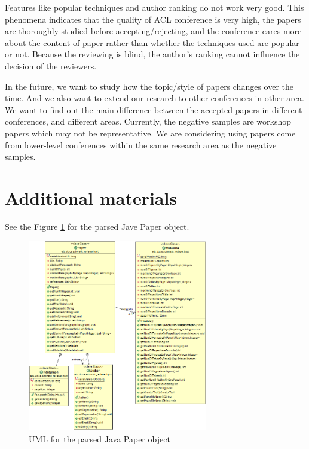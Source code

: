 \documentclass[11pt,letterpaper]{article}
\begin{document}
Features like popular techniques and author ranking do not work very good. 
This phenomena indicates that the quality of ACL conference is very high, the papers are thoroughly studied before accepting/rejecting, and the conference cares more about the content of paper rather than whether the techniques used are popular or not. 
Because the reviewing is blind, the author’s ranking cannot influence the decision of the reviewers. 


In the future, we want to study how the topic/style of papers changes over the time. 
And we also want to extend our research to other conferences in other area.
We want to find out the main difference between the accepted papers in different conferences, and different areas. 
Currently, the negative samples are workshop papers which may not be representative. 
We are considering using papers come from lower-level conferences within the same research area as the negative samples. 

\appendix

\section{Additional materials}
See the Figure \ref{fig:uml} for the parsed Jave Paper object.  
\begin{figure}[htb]
  \centering
	 	 \includegraphics[width=0.7\textwidth]{materials/paper_uml.png}
		\caption{UML for the parsed Java Paper object}
		\label{fig:uml}
\end{figure}
\end{document}
